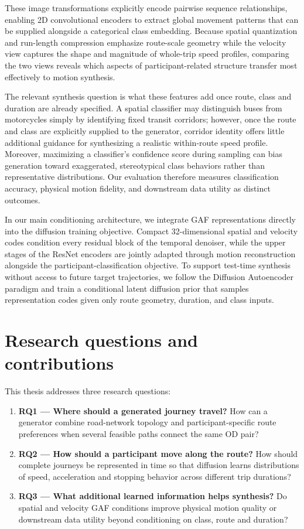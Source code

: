 These image transformations explicitly encode pairwise sequence relationships, enabling 2D convolutional encoders to extract global movement patterns that can be supplied alongside a categorical class embedding. Because spatial quantization and run-length compression emphasize route-scale geometry while the velocity view captures the shape and magnitude of whole-trip speed profiles, comparing the two views reveals which aspects of participant-related structure transfer most effectively to motion synthesis.

The relevant synthesis question is what these features add once route, class and duration are already specified. A spatial classifier may distinguish buses from motorcycles simply by identifying fixed transit corridors; however, once the route and class are explicitly supplied to the generator, corridor identity offers little additional guidance for synthesizing a realistic within-route speed profile. Moreover, maximizing a classifier's confidence score during sampling can bias generation toward exaggerated, stereotypical class behaviors rather than representative distributions. Our evaluation therefore measures classification accuracy, physical motion fidelity, and downstream data utility as distinct outcomes.

In our main conditioning architecture, we integrate GAF representations directly into the diffusion training objective. Compact 32-dimensional spatial and velocity codes condition every residual block of the temporal denoiser, while the upper stages of the ResNet encoders are jointly adapted through motion reconstruction alongside the participant-classification objective. To support test-time synthesis without access to future target trajectories, we follow the Diffusion Autoencoder paradigm \cite{diffae} and train a conditional latent diffusion prior that samples representation codes given only route geometry, duration, and class inputs.

\section{Research questions and contributions}

This thesis addresses three research questions:
\begin{enumerate}
    \item \textbf{RQ1 --- Where should a generated journey travel?} How can a generator combine road-network topology and participant-specific route preferences when several feasible paths connect the same OD pair?
    \item \textbf{RQ2 --- How should a participant move along the route?} How should complete journeys be represented in time so that diffusion learns distributions of speed, acceleration and stopping behavior across different trip durations?
    \item \textbf{RQ3 --- What additional learned information helps synthesis?} Do spatial and velocity GAF conditions improve physical motion quality or downstream data utility beyond conditioning on class, route and duration?
\end{enumerate}


